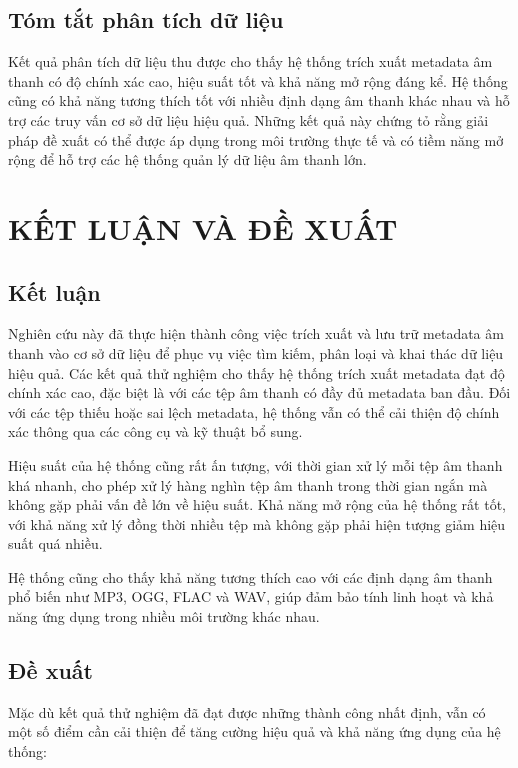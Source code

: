 \documentclass[conference]{IEEEtran}
\begin{document}
\subsection{Tóm tắt phân tích dữ liệu}
Kết quả phân tích dữ liệu thu được cho thấy hệ thống trích xuất metadata âm thanh có độ chính xác cao, hiệu suất tốt và khả năng mở rộng đáng kể. Hệ thống cũng có khả năng tương thích tốt với nhiều định dạng âm thanh khác nhau và hỗ trợ các truy vấn cơ sở dữ liệu hiệu quả. Những kết quả này chứng tỏ rằng giải pháp đề xuất có thể được áp dụng trong môi trường thực tế và có tiềm năng mở rộng để hỗ trợ các hệ thống quản lý dữ liệu âm thanh lớn.



\section{KẾT LUẬN VÀ ĐỀ XUẤT}

\subsection{Kết luận}
Nghiên cứu này đã thực hiện thành công việc trích xuất và lưu trữ metadata âm thanh vào cơ sở dữ liệu để phục vụ việc tìm kiếm, phân loại và khai thác dữ liệu hiệu quả. Các kết quả thử nghiệm cho thấy hệ thống trích xuất metadata đạt độ chính xác cao, đặc biệt là với các tệp âm thanh có đầy đủ metadata ban đầu. Đối với các tệp thiếu hoặc sai lệch metadata, hệ thống vẫn có thể cải thiện độ chính xác thông qua các công cụ và kỹ thuật bổ sung.

Hiệu suất của hệ thống cũng rất ấn tượng, với thời gian xử lý mỗi tệp âm thanh khá nhanh, cho phép xử lý hàng nghìn tệp âm thanh trong thời gian ngắn mà không gặp phải vấn đề lớn về hiệu suất. Khả năng mở rộng của hệ thống rất tốt, với khả năng xử lý đồng thời nhiều tệp mà không gặp phải hiện tượng giảm hiệu suất quá nhiều.

Hệ thống cũng cho thấy khả năng tương thích cao với các định dạng âm thanh phổ biến như MP3, OGG, FLAC và WAV, giúp đảm bảo tính linh hoạt và khả năng ứng dụng trong nhiều môi trường khác nhau.

\subsection{Đề xuất}
Mặc dù kết quả thử nghiệm đã đạt được những thành công nhất định, vẫn có một số điểm cần cải thiện để tăng cường hiệu quả và khả năng ứng dụng của hệ thống:
\end{document}
